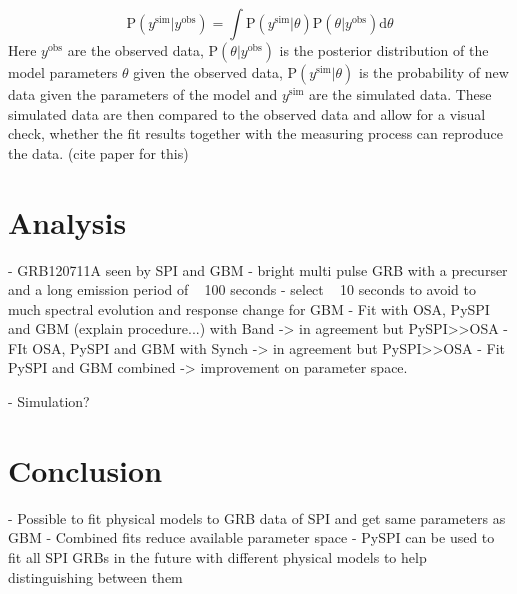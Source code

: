 \documentclass[modern]{aastex631}
\begin{document}
\begin{equation}
  \textrm{P}(y^{\textrm{sim}}|y^{\textrm{obs}}) = \int \textrm{P}(y^{\textrm{sim}}|\theta) \textrm{P}(\theta|y^{\textrm{obs}}) \mathrm{d}\theta
\end{equation}
\noindent
Here $y^{\textrm{obs}}$ are the observed data, $\textrm{P}(\theta|y^{\textrm{obs}})$ is the posterior distribution of the model parameters $\theta$ given the observed data, $\textrm{P}(y^{\textrm{sim}}|\theta)$ is the probability of new data given the parameters of the model and $y^{\textrm{sim}}$ are the simulated data. These simulated data are then compared to the observed data and allow for a visual check, whether the fit results together with the measuring process can reproduce the data. (cite paper for this)
\section{Analysis}

- GRB120711A seen by SPI and GBM
- bright multi pulse GRB with a precurser and a long emission period of ~ 100 seconds
- select ~ 10 seconds to avoid to much spectral evolution and response change for GBM
- Fit with OSA, PySPI and GBM (explain procedure...) with Band -> in agreement but PySPI>>OSA
- FIt OSA, PySPI and GBM with Synch -> in agreement but PySPI>>OSA
- Fit PySPI and GBM combined -> improvement on parameter space.

- Simulation?

\section{Conclusion}

- Possible to fit physical models to GRB data of SPI and get same parameters as GBM
- Combined fits reduce available parameter space
- PySPI can be used to fit all SPI GRBs in the future with different physical models to help distinguishing between them
\end{document}
